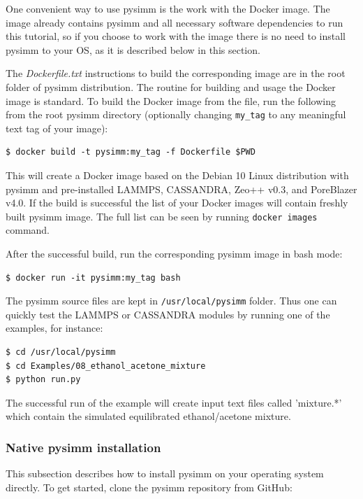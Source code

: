 \documentclass[9pt,tutorial]{livecoms}
\begin{document}
One convenient way to use pysimm is the work with the Docker image.
The image already contains pysimm and all necessary software dependencies to run this tutorial, so if you choose to work with the image there is no need to install pysimm to your OS, as it is described below in this section.

The \textit{Dockerfile.txt} instructions to build the corresponding image are in the root folder of pysimm distribution. The routine for building and usage the Docker image is standard. To build the Docker image from the file, run the following from the root pysimm directory (optionally changing \lstinline$my_tag$ to any meaningful text tag of your image):

\begin{lstlisting}
$ docker build -t pysimm:my_tag -f Dockerfile $PWD
\end{lstlisting}

This will create a Docker image based on the Debian 10 Linux distribution with pysimm and pre-installed LAMMPS, CASSANDRA, Zeo++ v0.3, and PoreBlazer v4.0. If the build is successful the list of your Docker images will contain freshly built pysimm image. The full list can be seen by running \lstinline$docker images$ command. 

After the successful build, run the corresponding pysimm image in bash mode:
\begin{lstlisting}
$ docker run -it pysimm:my_tag bash
\end{lstlisting}

The pysimm source files are kept in \lstinline$/usr/local/pysimm$ folder. Thus one can quickly test the LAMMPS or CASSANDRA modules by running one of the examples, for instance:

\begin{lstlisting}
$ cd /usr/local/pysimm
$ cd Examples/08_ethanol_acetone_mixture
$ python run.py
\end{lstlisting}

The successful run of the example will create input text files called 'mixture.*' which contain the simulated equilibrated ethanol/acetone mixture.


\subsubsection{Native pysimm installation}

This subsection describes how to install pysimm on your operating system directly. To get started, clone the pysimm repository from GitHub:
\end{document}
